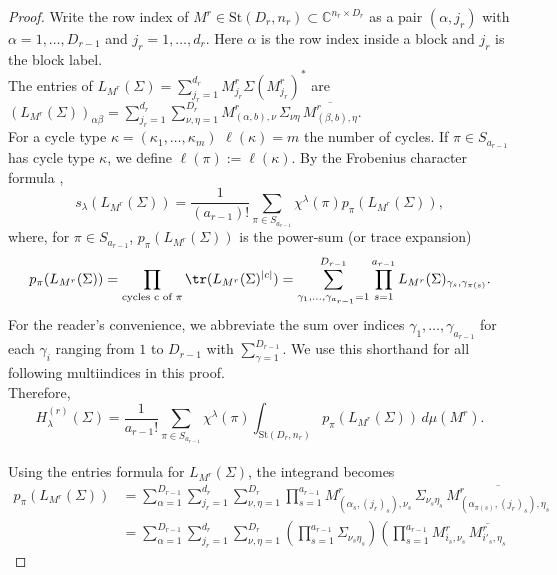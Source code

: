 \documentclass{article}
\theoremstyle{definition}
\newcommand{\C}{\mathbb{C}}
\newcommand{\St}{\mathrm{St}}
\begin{document}
\begin{proof}
Write the row index of \(M^r\in\St(D_r, n_r) \subset \C^{n_r\times D_r}\) as a pair $(\alpha,j_r)$ with $\alpha=1,\dots,D_{r-1}$ and
$j_r=1,\dots,d_r$.
Here \(\alpha\) is the row index inside a block and \(j_r\) is the block label.
\\
The entries of $L_{M^r}(\Sigma)=\sum_{j_r=1}^{d_r} M^r_{j_r}\Sigma (M_{j_r}^r)^*$ are $(L_{M^r}(\Sigma))_{\alpha\beta}
=
\sum_{j_r=1}^{d_r}
\sum_{\nu, \eta=1}^{D_r}
M^r_{(\alpha,b),\nu}\,
\Sigma_{\nu \eta}\,
\overline{M^r_{(\beta,b),\eta}}$.
\\
For a cycle type $\kappa=(\kappa_1,\dots,\kappa_m)$ $\ell(\kappa)=m$ the number of cycles. If $\pi \in S_{a_{r-1}}$ has cycle type $\kappa$, we define $\ell(\pi):=\ell(\kappa)$. By the Frobenius character formula \cite{Stanley_2024}, 
\begin{equation}\label{eq:frobenius}
s_\lambda(L_{M^r}(\Sigma))
=
\frac1{(a_{r-1})!}
\sum_{\pi\in S_{a_{r-1}}}
\chi^\lambda(\pi)p_\pi(L_{M^r}(\Sigma)),
\end{equation}
where, for \(\pi\in S_{a_{r-1}}\), $p_{\pi}(L_{M^r}(\Sigma))$ is the power-sum (or trace expansion)
\begin{equation*}
    p_\pi(L_{M^r}(\Sigma))
= \prod_{\text{cycles c of $\pi$}}\tr(L_{M^r}(\Sigma)^{|c|}) 
=
\sum_{\gamma_1, \dots, \gamma_{a_{r-1}}=1}^{D_{r-1}}
\prod_{s=1}^{a_{r-1}}
L_{M^r}(\Sigma)_{\gamma_s,\gamma_{\pi(s)}}.
\end{equation*}
For the reader's convenience, we abbreviate the sum over indices $\gamma_1, \dots, \gamma_{a_{r-1}}$ for each $\gamma_i$ ranging from $1$ to $D_{r-1}$ with $\sum_{\gamma=1}^{D_{r-1}}$. We use this shorthand for all following multiindices in this proof.
\\
Therefore,
\[
H_\lambda^{(r)}(\Sigma)
=
\frac1{a_{r-1}!}
\sum_{\pi\in S_{a_{r-1}}}
\chi^\lambda(\pi)
\int_{\St(D_r,n_r)}
p_\pi(L_{M^r}(\Sigma))\,d\mu(M^r).
\]
\\
Using the entries formula for \(L_{M^r}(\Sigma)\), the integrand becomes
\begin{align*}
    p_\pi(L_{M^r}(\Sigma))
&=
\sum_{\alpha=1}^{D_{r-1}}\sum_{j_r=1}^{d_r}\sum_{\nu, \eta=1}^{D_r}
\prod_{s=1}^{a_{r-1}}
M^r_{(\alpha_s,(j_r)_s),\nu_s}\,
\Sigma_{\nu_s\eta_s}\,
\overline{M^r_{(\alpha_{\pi(s)},(j_r)_s),\eta_s}} \\
&=
\sum_{\alpha=1}^{D_{r-1}}\sum_{j_r=1}^{d_r}\sum_{\nu, \eta=1}^{D_r}
\left(
\prod_{s=1}^{a_{r-1}} \Sigma_{\nu_s \eta_s}
\right)
\left(
\prod_{s=1}^{a_{r-1}}
M^r_{i_s,\nu_s}\,
\overline{M^r_{i'_s,\eta_s}}

\end{align*}
\end{proof}
\end{document}
